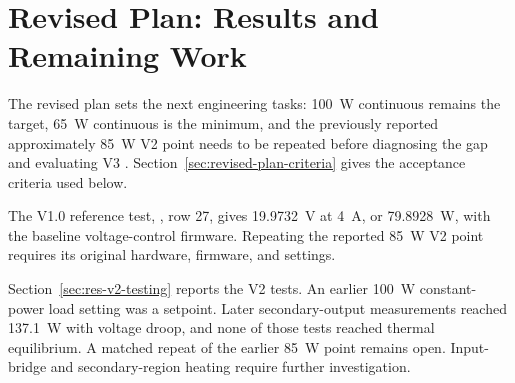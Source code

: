 \section{Revised Plan: Results and Remaining Work}
\label{sec:res-revised-plan}

The revised plan sets the next engineering tasks:
\SI{100}{\watt} continuous remains the target, \SI{65}{\watt} continuous
is the minimum, and the previously reported approximately \SI{85}{\watt}
V2 point needs to be repeated before diagnosing the gap and evaluating V3
\cite{projectOctoberPlan}. Section~\ref{sec:revised-plan-criteria} gives
the acceptance criteria used below.

The V1.0 reference test, , row 27,
gives \SI{19.9732}{\volt} at \SI{4}{\ampere}, or
\SI{79.8928}{\watt}, with the baseline voltage-control firmware. Repeating the reported \SI{85}{\watt} V2 point requires its original
hardware, firmware, and settings.

Section~\ref{sec:res-v2-testing} reports the V2 tests. An earlier \SI{100}{\watt} constant-power load setting was a setpoint. Later secondary-output measurements reached \SI{137.1}{\watt} with voltage droop, and none of those tests reached thermal equilibrium. A matched repeat of the earlier \SI{85}{\watt} point remains open. Input-bridge and secondary-region heating require further investigation.

